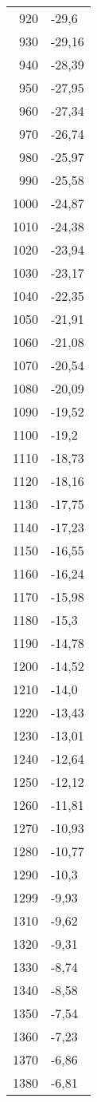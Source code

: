 \begin{table}
\begin{tabular}{rl}
920	&	-29,6\\
930	&	-29,16\\
940	&	-28,39\\
950	&	-27,95\\
960	&	-27,34\\
970	&	-26,74\\
980	&	-25,97\\
990	&	-25,58\\
1000	&	-24,87\\
1010	&	-24,38\\
1020	&	-23,94\\
1030	&	-23,17\\
1040	&	-22,35\\
1050	&	-21,91\\
1060	&	-21,08\\
1070	&	-20,54\\
1080	&	-20,09\\
1090	&	-19,52\\
1100	&	-19,2\\
1110	&	-18,73\\
1120	&	-18,16\\
1130	&	-17,75\\
1140	&	-17,23\\
1150	&	-16,55\\
1160	&	-16,24\\
1170	&	-15,98\\
1180	&	-15,3\\
1190	&	-14,78\\
1200	&	-14,52\\
1210	&	-14,0\\
1220	&	-13,43\\
1230	&	-13,01\\
1240	&	-12,64\\
1250	&	-12,12\\
1260	&	-11,81\\
1270	&	-10,93\\
1280	&	-10,77\\
1290	&	-10,3\\
1299	&	-9,93\\
1310	&	-9,62\\
1320	&	-9,31\\
1330	&	-8,74\\
1340	&	-8,58\\
1350	&	-7,54\\
1360	&	-7,23\\
1370	&	-6,86\\
1380	&	-6,81\\

\end{tabular}
\end{table}
